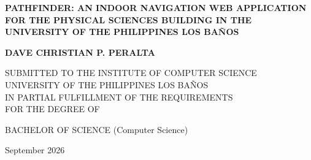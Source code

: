 \thispagestyle{empty}
{\singlespacing
\begin{center}
\vspace*{0.2in}
{\bfseries
PATHFINDER: AN INDOOR NAVIGATION WEB APPLICATION\\
FOR THE PHYSICAL SCIENCES BUILDING IN THE\\
UNIVERSITY OF THE PHILIPPINES LOS BA\~{N}OS}

\vspace{1.0in}
{\bfseries DAVE CHRISTIAN P. PERALTA}

\vspace{1.0in}
SUBMITTED TO THE INSTITUTE OF COMPUTER SCIENCE\\
UNIVERSITY OF THE PHILIPPINES LOS BA\~{N}OS\\
IN PARTIAL FULFILLMENT OF THE REQUIREMENTS\\
FOR THE DEGREE OF

\vspace{1.0in}
BACHELOR OF SCIENCE (Computer Science)

\vspace{1.0in}
September 2026
\end{center}}
\clearpage
